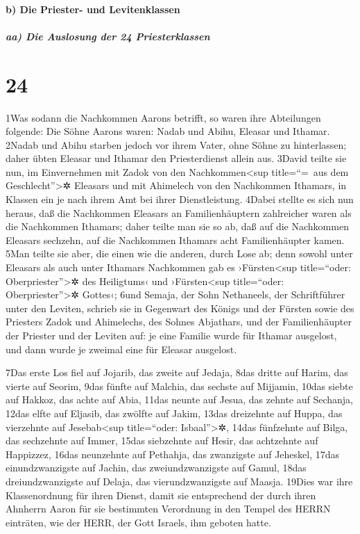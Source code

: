 \hypertarget{b-die-priester--und-levitenklassen}{%
\paragraph{b) Die Priester- und
Levitenklassen}\label{b-die-priester--und-levitenklassen}}

\hypertarget{aa-die-auslosung-der-24-priesterklassen}{%
\subparagraph{aa) Die Auslosung der 24
Priesterklassen}\label{aa-die-auslosung-der-24-priesterklassen}}

\hypertarget{section-23}{%
\section{24}\label{section-23}}

1Was sodann die Nachkommen Aarons betrifft, so waren ihre Abteilungen
folgende: Die Söhne Aarons waren: Nadab und Abihu, Eleasar und Ithamar.
2Nadab und Abihu starben jedoch vor ihrem Vater, ohne Söhne zu
hinterlassen; daher übten Eleasar und Ithamar den Priesterdienst allein
aus. 3David teilte sie nun, im Einvernehmen mit Zadok von den
Nachkommen\textless sup title=``=~aus dem Geschlecht''\textgreater✲
Eleasars und mit Ahimelech von den Nachkommen Ithamars, in Klassen ein
je nach ihrem Amt bei ihrer Dienstleistung. 4Dabei stellte es sich nun
heraus, daß die Nachkommen Eleasars an Familienhäuptern zahlreicher
waren als die Nachkommen Ithamars; daher teilte man sie so ab, daß auf
die Nachkommen Eleasars sechzehn, auf die Nachkommen Ithamars acht
Familienhäupter kamen. 5Man teilte sie aber, die einen wie die anderen,
durch Lose ab; denn sowohl unter Eleasars als auch unter Ithamars
Nachkommen gab es ›Fürsten\textless sup title=``oder:
Oberpriester''\textgreater✲ des Heiligtums‹ und ›Fürsten\textless sup
title=``oder: Oberpriester''\textgreater✲ Gottes‹; 6und Semaja, der Sohn
Nethaneels, der Schriftführer unter den Leviten, schrieb sie in
Gegenwart des Königs und der Fürsten sowie des Priesters Zadok und
Ahimelechs, des Sohnes Abjathars, und der Familienhäupter der Priester
und der Leviten auf: je eine Familie wurde für Ithamar ausgelost, und
dann wurde je zweimal eine für Eleasar ausgelost.

7Das erste Los fiel auf Jojarib, das zweite auf Jedaja, 8das dritte auf
Harim, das vierte auf Seorim, 9das fünfte auf Malchia, das sechste auf
Mijjamin, 10das siebte auf Hakkoz, das achte auf Abia, 11das neunte auf
Jesua, das zehnte auf Sechanja, 12das elfte auf Eljasib, das zwölfte auf
Jakim, 13das dreizehnte auf Huppa, das vierzehnte auf
Jesebab\textless sup title=``oder: Isbaal''\textgreater✲, 14das
fünfzehnte auf Bilga, das sechzehnte auf Immer, 15das siebzehnte auf
Hesir, das achtzehnte auf Happizzez, 16das neunzehnte auf Pethahja, das
zwanzigste auf Jeheskel, 17das einundzwanzigste auf Jachin, das
zweiundzwanzigste auf Gamul, 18das dreiundzwanzigste auf Delaja, das
vierundzwanzigste auf Maasja. 19Dies war ihre Klassenordnung für ihren
Dienst, damit sie entsprechend der durch ihren Ahnherrn Aaron für sie
bestimmten Verordnung in den Tempel des HERRN einträten, wie der HERR,
der Gott Israels, ihm geboten hatte.

